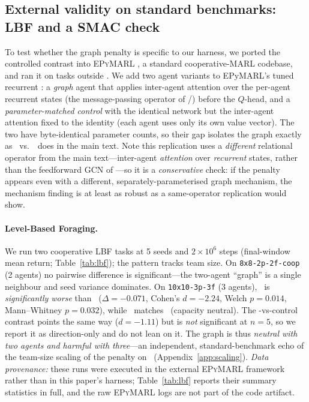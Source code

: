 \begin{appendices}
\section{External validity on standard benchmarks: LBF and a SMAC check}
\label{app:standard}

To test whether the graph penalty is specific to our harness, we ported the
controlled contrast into \textsc{EPyMARL} \citep{papoudakis_2021_benchmarking},
a standard cooperative-MARL codebase, and ran it on tasks outside \coordgrid.
We add two agent variants to EPyMARL's tuned recurrent \qmix: a \emph{graph}
agent that applies inter-agent attention over the per-agent recurrent states
(the message-passing operator of /) before the
$Q$-head, and a \emph{parameter-matched control} with the identical network but
the inter-agent attention fixed to the identity (each agent uses only its own
value vector). The two have byte-identical parameter counts, so their gap
isolates the graph exactly as \gnnqmix\ vs.\ \mlpqmix\ does in the main text.
Note this replication uses a \emph{different} relational operator from the
main text---inter-agent \emph{attention} over \emph{recurrent} states, rather
than the feedforward GCN of \gnnqmix---so it is a \emph{conservative} check:
if the penalty appears even with a different, separately-parameterised graph
mechanism, the mechanism finding is at least as robust as a same-operator
replication would show.

\paragraph{Level-Based Foraging.} We run two cooperative LBF tasks
\citep{papoudakis_2021_benchmarking} at 5 seeds and $2\times10^6$ steps
(final-window mean return; Table~\ref{tab:lbf}); the pattern tracks team
size. On \texttt{8x8-2p-2f-coop} (2 agents) no pairwise difference is
significant---the two-agent ``graph'' is a single neighbour and seed
variance dominates. On \texttt{10x10-3p-3f} (3 agents), \gnnqmix\ is
\emph{significantly worse} than \qmix\ ($\Delta=-0.071$, Cohen's $d=-2.24$,
Welch $p=0.014$, Mann--Whitney $p=0.032$), while \mlpqmix\ matches \qmix\
(capacity neutral). The \gnnqmix-vs-control contrast points the same way
($d=-1.11$) but is \emph{not} significant at $n{=}5$, so we report it as
direction-only and do not lean on it. The graph
is thus \emph{neutral with two agents and harmful with three}---an
independent, standard-benchmark echo of the team-size scaling of the penalty
on \coordgrid\ (Appendix~\ref{app:scaling}). \emph{Data provenance:} these
runs were executed in the external \textsc{EPyMARL} framework rather than in
this paper's harness; Table~\ref{tab:lbf} reports their summary statistics
in full, and the raw \textsc{EPyMARL} logs are not part of the code artifact.


\end{appendices}
